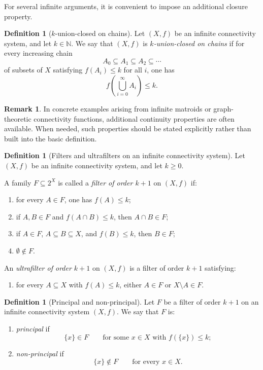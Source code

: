 \documentclass[10pt]{book}
\theoremstyle{definition}
\newtheorem{remark}[theorem]{Remark}
\newtheorem{definition}[theorem]{Definition}
\begin{document}
For several infinite arguments, it is convenient to impose an additional closure property.

\begin{definition}[\(k\)-union-closed on chains]
\label{def:k-limit-closed}
Let \((X,f)\) be an infinite connectivity system, and let \(k\in \mathbb{N}\).
We say that \((X,f)\) is \emph{\(k\)-union-closed on chains} if for every increasing chain
\[
A_0 \subseteq A_1 \subseteq A_2 \subseteq \cdots
\]
of subsets of \(X\) satisfying \(f(A_i)\leq k\) for all \(i\), one has
\[
f\!\left(\bigcup_{i=0}^{\infty} A_i\right)\leq k.
\]
\end{definition}

\begin{remark}
In concrete examples arising from infinite matroids or graph-theoretic connectivity functions, additional continuity properties are often available.
When needed, such properties should be stated explicitly rather than built into the basic definition.
\end{remark}

\begin{definition}[Filters and ultrafilters on an infinite connectivity system]
\label{def:ultrafilter_infinite_connectivity_system}
Let \((X,f)\) be an infinite connectivity system, and let \(k\geq 0\).

A family \(F\subseteq 2^X\) is called a \emph{filter of order \(k+1\)} on \((X,f)\) if:
\begin{enumerate}
    \item[(Q0)] for every \(A\in F\), one has \(f(A)\leq k\);
    \item[(Q1)] if \(A,B\in F\) and \(f(A\cap B)\leq k\), then \(A\cap B\in F\);
    \item[(Q2)] if \(A\in F\), \(A\subseteq B\subseteq X\), and \(f(B)\leq k\), then \(B\in F\);
    \item[(Q3)] \(\emptyset\notin F\).
\end{enumerate}

An \emph{ultrafilter of order \(k+1\)} on \((X,f)\) is a filter of order \(k+1\) satisfying:
\begin{enumerate}
    \item[(Q4)] for every \(A\subseteq X\) with \(f(A)\leq k\), either \(A\in F\) or \(X\setminus A\in F\).
\end{enumerate}
\end{definition}

\begin{definition}[Principal and non-principal]
\label{def:principal_nonprincipal_infinite}
Let \(F\) be a filter of order \(k+1\) on an infinite connectivity system \((X,f)\).
We say that \(F\) is:
\begin{enumerate}
    \item \emph{principal} if
    \[
    \{x\}\in F
    \qquad\text{for some } x\in X \text{ with } f(\{x\})\leq k;
    \]
    \item \emph{non-principal} if
    \[
    \{x\}\notin F
    \qquad\text{for every } x\in X.
    \]
\end{enumerate}
\end{definition}
\end{document}
